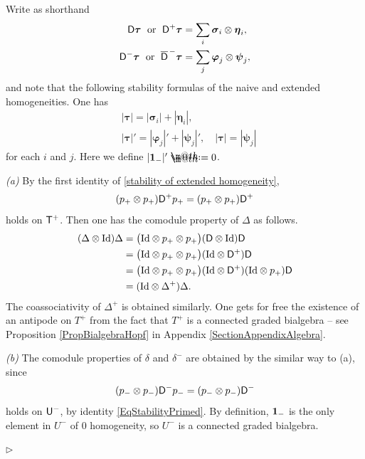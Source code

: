 \documentclass[10pt, reqno]{amsart}
\makeatletter
\numberwithin{subsection}{section}
\numberwithin{subsubsection}{subsection}
\numberwithin{equation}{section} %
\newenvironment{Dem}[1][\unskip]{%
    \begin{list}{\hspace{1.15cm}{\sf \textbf{{\small Proof #1 --}}}}{%
        \setlength{\topsep}{0pt}%
        \setlength{\leftmargin}{0pt}%
        \setlength{\rightmargin}{0pt}%
        \setlength{\listparindent}{0pt}%
        \setlength{\itemindent}{0pt}%
        \setlength{\parsep}{0pt}%
        \addtolength{\leftmargin}{0pt}%
        \addtolength{\rightmargin}{0pt}%
    } \item }{\hfill $\rhd$\end{list}\smallskip}
\theoremstyle{mystyle}
\theoremstyle{mystyle2}
\theoremstyle{mystyle3}
\newcommand{\bstau}{\boldsymbol{\tau}}
\newcommand{\bssigma}{\boldsymbol{\sigma}}
\newcommand{\bseta}{\boldsymbol{\eta}}
\newcommand{\bsvarphi}{\boldsymbol{\varphi}}
\newcommand{\mcFsi}{\boldsymbol{\psi}}
\newcommand{\ssk}{\smallskip}
\newcommand*{\defeq}{\mathrel{\rlap{%
                     \raisebox{0.3ex}{$\m@th\cdot$}}%
                     \raisebox{-0.3ex}{$\m@th\cdot$}}%
                     =}
\makeatother
\begin{document}
\begin{Dem} 
Write as shorthand
\begin{align*}
{\sf D}\bstau\;\textrm{ or } \;{\sf D}^+\bstau &= \sum_i \bssigma_i\otimes\bseta_i,   \\
{\sf D}^-\bstau\;\textrm{ or } \;\overline{\sf D}^{\,-}\bstau &= \sum_j 
\bsvarphi_j\otimes\mcFsi_j,
\end{align*}
and note that the following stability formulas of the naive and extended homogeneities. One has
\begin{align}\label{stability of extended homogeneity}
&|\bstau| = |\bssigma_i| + |\bseta_i|,   \\
&|\bstau|' = |\bsvarphi_j|' + |\mcFsi_j|',\quad |\bstau| = |\mcFsi_j| 
  \label{EqStabilityPrimed}
\end{align}
for each $i$ and $j$. Here we define $|{\bf1}_-|' \defeq  0$.

\ssk

\textit{\textsf{(a)}} 
By the first identity of \eqref{stability of extended homogeneity},
$$
(p_+\otimes p_+) {\sf D}^+p_+=(p_+\otimes p_+){\sf D}^+
$$
holds on ${\sf T}^+$. Then one has the comodule property of $\Delta$ as follows.
\begin{align*}
(\Delta\otimes\text{\rm Id})\Delta
&= \big(\text{\rm Id}\otimes p_+\otimes p_+\big)({\sf D}\otimes\text{\rm Id}){\sf D}   \\
&= \big(\text{\rm Id}\otimes p_+\otimes p_+\big)(\text{\rm Id}\otimes{\sf D}^+){\sf D}   \\
&= \big(\text{\rm Id}\otimes p_+\otimes p_+\big)(\text{\rm Id}\otimes{\sf D}^+)(\text{\rm Id}\otimes p_+){\sf D}   \\
&= (\text{\rm Id}\otimes\Delta^+)\Delta.
\end{align*}
The coassociativity of $\Delta^+$ is obtained similarly. One gets for free the existence of an antipode on $T^+$ from the fact that $T^+$ is a connected graded bialgebra -- see Proposition \ref{PropBialgebraHopf} in Appendix {\sf \ref{SectionAppendixAlgebra}}.

\ssk

\textit{\textsf{(b)}}
The comodule properties of $\delta$ and $\delta^-$ are obtained by the similar way to {\sf (a)}, since
$$
(p_-\otimes p_-){\sf D}^-p_-=(p_-\otimes p_-){\sf D}^-
$$
holds on ${\sf U}^-$, by identity \eqref{EqStabilityPrimed}.
By definition, ${\bf1}_-$ is the only element in $U^-$ of $0$ homogeneity, so $U^-$ is a connected graded bialgebra.


\end{Dem}
\end{document}
